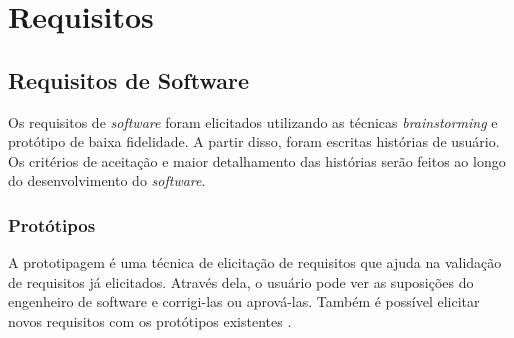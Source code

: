 \chapter{Requisitos}

\section{Requisitos de Software}

Os requisitos de \textit{software} foram elicitados utilizando as técnicas \textit{brainstorming} e protótipo de baixa fidelidade. A partir disso, foram escritas histórias de usuário. Os critérios de aceitação e maior detalhamento das histórias serão feitos ao longo do desenvolvimento do \textit{software}.

\subsection{Protótipos}

A prototipagem é uma técnica de elicitação de requisitos que ajuda na validação de requisitos já elicitados. Através dela, o usuário pode ver as suposições do engenheiro de software e corrigi-las ou aprová-las. Também é possível elicitar novos requisitos com os protótipos existentes \cite{ieee2004swebok}.

